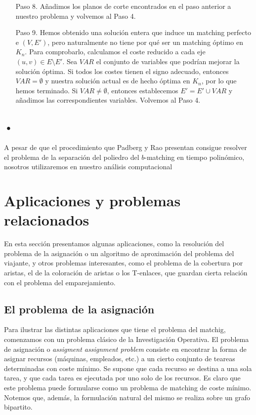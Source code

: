 \documentclass[twoside,a4paper,openright,12pt,tikz]{book}
\begin{document}
\begin{itemize}
\item[Paso 8.] Añadimos los planos de corte encontrados en el paso anterior a nuestro problema y volvemos al Paso 4.
\item[Paso 9.] Hemos obtenido una solución entera que induce un matching perfecto e $(V,E')$, pero naturalmente no tiene por qué ser un matching óptimo en $K_n$. Para comprobarlo, calculamos el coste reducido a cada eje $(u,v)\in E\setminus E'$. Sea $VAR$ el conjunto de variables que podrían mejorar la solución óptima. Si todos los costes tienen el signo adecuado, entonces $VAR=\emptyset$ y nuestra solución actual es de hecho óptima en $K_n$, por lo que hemos terminado. Si $VAR\neq \emptyset$, entonces establecemos $E'=E'\cup VAR$ y añadimos las correspondientes variables. Volvemos al Paso 4.
\end{itemize}
\subsection{•}
A pesar de que el procedimiento que Padberg y Rao presentan consigue resolver el problema de la separación del poliedro del $b$-matching en tiempo polinómico, nosotros utilizaremos en nuestro análisis computacional 
\section{Aplicaciones y problemas relacionados}
En esta sección presentamos algunas aplicaciones, como la resolución del problema de la asignación o un algoritmo de aproximación del problema del viajante, y otros problemas interesantes, como el problema de la cobertura por aristas, el de la coloración de aristas o los T-enlaces, que guardan cierta relación con el problema del emparejamiento.
\subsection{El problema de la asignación}
Para ilustrar las distintas aplicaciones que tiene el problema del matchig, comenzamos con un problema clásico de la Investigación Operativa. El problema de asignación o \textit{assigment assignment problem} consiste en encontrar la forma de asignar recursos (máquinas, empleados, etc.) a un cierto conjunto de teareas determinadas con coste mínimo. Se supone que cada recurso se destina a una sola tarea, y que cada tarea es ejecutada por uno solo de los recursos. Es claro que este problema puede formularse como un problema de matching de coste mínimo. Notemos que, además, la formulación natural del mismo se realiza sobre un grafo bipartito. 
\end{document}
